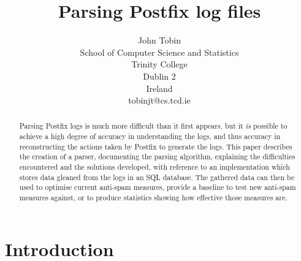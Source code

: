 \documentclass[a4paper,12pt,draft]{article}
\newcounter{dummy}
\begin{document}


\title{Parsing Postfix log files}
\author{John Tobin \\ School of Computer Science and Statistics \\
Trinity College \\ Dublin 2 \\ Ireland \\ tobinjt@cs.tcd.ie}
\maketitle

\begin{abstract}

    Parsing Postfix logs is much more difficult than it first appears, but
    it \textit{is\/} possible to achieve a high degree of accuracy in
    understanding the logs, and thus accuracy in reconstructing the actions
    taken by Postfix to generate the logs.  This paper describes the
    creation of a parser, documenting the parsing algorithm, explaining the
    difficulties encountered and the solutions developed, with reference to
    an implementation which stores data gleaned from the logs in an SQL
    database.  The gathered data can then be used to optimise current
    anti-spam measures, provide a baseline to test new anti-spam measures
    against, or to produce statistics showing how effective those measures
    are.

\end{abstract}

\newpage
\tableofcontents
\listoffigures
\listoftables

\newpage
\section{Introduction}

\label{introduction}
\end{document}
